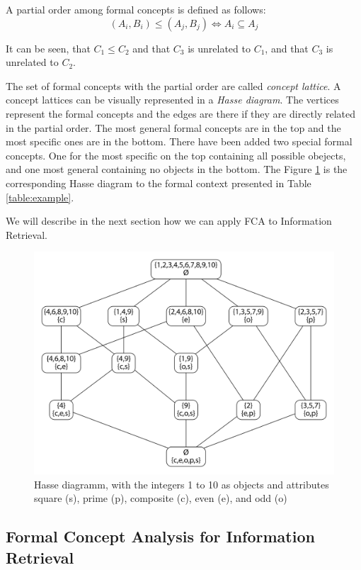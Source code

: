 \documentclass[11pt]{report}
\begin{document}
A partial order among formal concepts is defined as follows:
\begin{equation}
	(A_i,B_i) \le (A_j, B_j) \Longleftrightarrow	A_i \subseteq A_j
\end{equation} 

It can be seen, that $C_1 \le C_2$ and that $C_3$ is unrelated to $C_1$, and that $C_3$ is unrelated to $C_2$.

The set of formal concepts with the partial order are called \textit{concept lattice}. A concept lattices can be visually represented in a \textit{Hasse diagram}. The vertices represent the formal concepts and the edges are there if they are directly related in the partial order. The most general formal concepts are in the top and the most specific ones are in the bottom. There have been added two special formal concepts. One for the most specific on the top containing all possible obejects, and one most general containing no objects in the bottom. The Figure \ref{figure:example} is the corresponding Hasse diagram to the formal context presented in Table \ref{table:example}.

We will describe in the next section how we can apply FCA to Information Retrieval.


\begin{figure}[h]
\caption{Hasse diagramm, with the integers 1 to 10 as objects and attributes square (s), prime (p), composite (c), even (e), and odd (o)}
\label{figure:example}
	\centering
	\includegraphics[width=\linewidth]{fcaExample}
\end{figure}

\subsection{Formal Concept Analysis for Information Retrieval}
\end{document}
